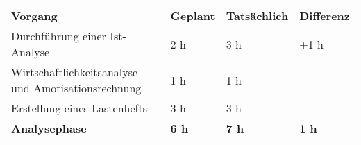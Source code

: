 \begin{tabularx}{\textwidth}{Xlll}
\rowcolor{heading}\textbf{Vorgang} & \textbf{Geplant} & \textbf{Tatsächlich} & \textbf{Differenz} \\
Durchführung einer Ist-Analyse & 2 h   & 3 h   & +1 h \\
\rowcolor{odd}Wirtschaftlichkeitsanalyse und Amotisationsrechnung & 1 h   & 1 h   &  \\
Erstellung eines Lastenhefts & 3 h   & 3 h   &  \\
\hline
\hline
\rowcolor{heading}\textbf{Analysephase} & \textbf{6 h} & \textbf{7 h} & \textbf{1 h} \\
\end{tabularx}
